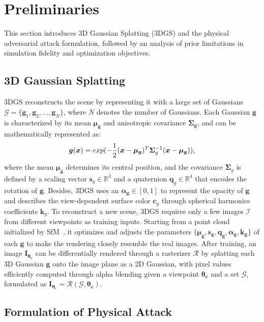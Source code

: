 \documentclass[10pt,journal,compsoc]{IEEEtran}
\begin{document}
% 
\section{Preliminaries}
\label{preliminaries}
This section introduces 3D Gaussian Splatting (3DGS) and the physical adversarial attack formulation, followed by an analysis of prior limitations in simulation fidelity and optimization objectives.

\subsection{3D Gaussian Splatting}
3DGS reconstructs the scene by representing it with a large set of Gaussians $\mathcal{G} = \{\bm{g}_1, \bm{g}_2, ..., \bm{g}_N\}$, where $N$ denotes the number of Gaussians.
Each Gaussian $\bm{g}$ is characterized by its mean $\bm{\mu_g}$ and anisotropic covariance $\bm{\Sigma_g}$, and can be mathematically represented as:
\begin{equation}
\vspace{-1mm}
\bm{g}(\bm{x}) = exp(-\frac{1}{2}(\bm{x}-\bm{\mu_g})^T\bm{\Sigma}_g^{-1}(\bm{x}-\bm{\mu_g})),
\label{eq:}
\end{equation}
where the mean $\bm{\mu_g}$ determines its central position, and the covariance $\bm{\Sigma}_g$ is defined by a scaling vector $\bm{s}_g \in \mathbb{R}^3$ and a quaternion $\bm{q}_g \in \mathbb{R}^4$ that encodes the rotation of $\bm{g}$.
Besides, 3DGS uses an $\bm{\alpha_g} \in [0, 1]$ to represent the opacity of $\bm{g}$ and describes the view-dependent surface color $\bm{c}_g$ through spherical harmonics coefficients $\bm{k}_g$. 
To reconstruct a new scene, 3DGS requires only a few images $\mathcal{I}$ from different viewpoints as training inputs. 
Starting from a point cloud initialized by SfM~\cite{noah2006sfm}, it optimizes and adjusts the parameters $\{\bm{\mu_g}, \bm{s_g}, \bm{q_g}, \bm{\alpha_g}, \bm{k_g}\}$ of each $\bm{g}$ to make the rendering closely resemble the real images.
After training, an image $\bm{I_{\theta_c}}$ can be differentially rendered through a rasterizer $\mathcal{R}$ by splatting each 3D Gaussian $\bm{g}$ onto the image plane as a 2D Gaussian, with pixel values efficiently computed through alpha blending given a viewpoint $\bm{\theta_c}$ and a set $\mathcal{G}$, formulated as $\bm{I_{\theta_c}} = \mathcal{R}(\mathcal{G}, \bm{\theta_c})$. 


\subsection{Formulation of Physical Attack}
\end{document}
